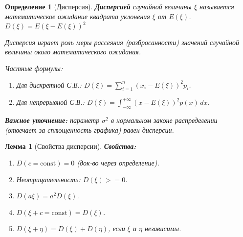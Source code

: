 \documentclass[14pt]{extarticle}
\theoremstyle{breakstyle}
\newtheorem{definition}{Определение}[subsection]
\newtheorem{lemma}{Лемма}[subsection]
\begin{document}
\begin{definition}[Дисперсия]

\textbf{Дисперсией} случайной величины $\xi$ называется математическое ожидание квадрата уклонения $\xi$ от $E(\xi)$.\\
$D(\xi) = E(\xi - E(\xi))^{2}$

\vspace{\baselineskip}

Дисперсия играет роль меры рассеяния (разбросанности) значений случайной величины около математического ожидания.

\vspace{\baselineskip}

Частные формулы:
\begin{enumerate}
    \item Для дискретной С.В.: $D(\xi) = \sum_{i = 1}^{n}(x_{i} - E(\xi))^2 p_{i}$.
    \item Для непрерывной С.В.: $D(\xi) = \int_{-\infty}^{+\infty} (x - E(\xi))^{2} p(x) \, dx$.
\end{enumerate}

\textbf{Важное уточнение:} параметр $\sigma^{2}$ в нормальном законе распределении (отвечает за сплющенность графика) равен дисперсии.

\end{definition}

\begin{lemma}[Свойства дисперсии]

\textbf{Свойства:}
\begin{enumerate}
    \item $D(c=\text{const}) = 0$ (док-во через определение).
    \item Неотрицательность: $D(\xi) >= 0$.
    \item $D(a \xi) = a^{2} D(\xi)$.
    \item $D(\xi + c=\text{const}) = D(\xi)$.
    \item $D(\xi + \eta) = D(\xi) + D(\eta)$, если $\xi$ и $\eta$ независимы.

\end{enumerate}

\end{lemma}
\end{document}
